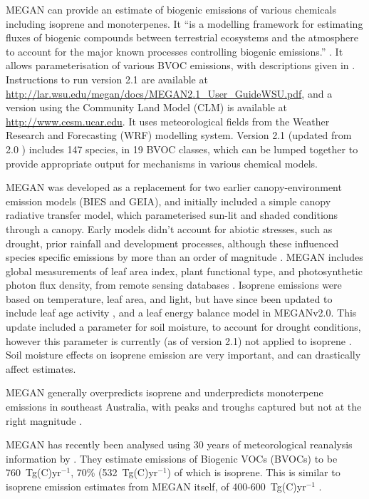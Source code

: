       MEGAN can provide an estimate of biogenic emissions of various chemicals including isoprene and monoterpenes.
      It ``is a modelling framework for estimating fluxes of biogenic compounds between terrestrial ecosystems and the atmosphere to account for the major known processes controlling biogenic emissions.'' \citep{Guenther2012}.
      It allows parameterisation of various BVOC emissions, with descriptions given in \cite{Guenther2012}.
      Instructions to run version 2.1 are available at \url{http://lar.wsu.edu/megan/docs/MEGAN2.1_User_GuideWSU.pdf}, and a version using the Community Land Model (CLM) is available at \url{http://www.cesm.ucar.edu}.
      It uses meteorological fields from the Weather Research and Forecasting (WRF) modelling system.
      Version 2.1 (updated from 2.0 \citep{Guenther2006}) includes 147 species, in 19 BVOC classes, which can be lumped together to provide appropriate output for mechanisms in various chemical models.
      
      MEGAN was developed as a replacement for two earlier canopy-environment emission models (BIES and GEIA), and initially included a simple canopy radiative transfer model, which parameterised sun-lit and shaded conditions through a canopy.
      Early models didn't account for abiotic stresses, such as drought, prior rainfall and development processes, although these influenced species specific emissions by more than an order of magnitude \citep{Niinemets1999}.
      MEGAN includes global measurements of leaf area index, plant functional type, and photosynthetic photon flux density, from remote sensing databases \citep{Kefauver2014}.
      Isoprene emissions were based on temperature, leaf area, and light, but have since been updated to include leaf age activity \citep{Guenther2000}, and a leaf energy balance model \citep{Guenther2006} in MEGANv2.0.
      This update included a parameter for soil moisture, to account for drought conditions, however this parameter is currently (as of version 2.1) not applied to isoprene \citep{Sindelarova2014}.
      Soil moisture effects on isoprene emission are very important, and can drastically affect estimates.
      
      MEGAN generally overpredicts isoprene and underpredicts monoterpene emissions in southeast Australia, with peaks and troughs captured but not at the right magnitude \citep{Emmerson2016}.
      
      MEGAN has recently been analysed using 30 years of meteorological reanalysis information by \citet{Sindelarova2014}.
      They estimate emissions of Biogenic VOCs (BVOCs) to be 760~Tg(C)yr$^{-1}$, 70\% (532~Tg(C)yr$^{-1}$) of which is isoprene.
      This is similar to isoprene emission estimates from MEGAN itself, of 400-600~Tg(C)yr$^{-1}$ \citep{Guenther2006}.
      
